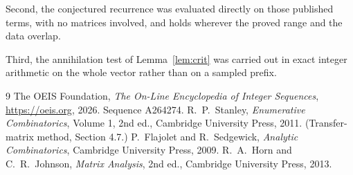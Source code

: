 \documentclass[11pt,a4paper]{article}
\theoremstyle{plain}
\theoremstyle{definition}
\begin{document}
Second, the conjectured recurrence was evaluated directly on those published terms, with no
matrices involved, and holds wherever the proved range and the data overlap.

Third, the annihilation test of Lemma~\ref{lem:crit} was carried out in exact integer
arithmetic on the whole vector rather than on a sampled prefix.

\begin{thebibliography}{9}
 The OEIS Foundation, \emph{The On-Line Encyclopedia of Integer
Sequences}, \url{https://oeis.org}, 2026. Sequence A264274.
 R.~P.~Stanley, \emph{Enumerative Combinatorics}, Volume 1, 2nd ed.,
Cambridge University Press, 2011. (Transfer-matrix method, Section 4.7.)
 P.~Flajolet and R.~Sedgewick, \emph{Analytic Combinatorics}, Cambridge
University Press, 2009.
 R.~A.~Horn and C.~R.~Johnson, \emph{Matrix Analysis}, 2nd ed., Cambridge
University Press, 2013.
\end{thebibliography}
\end{document}

